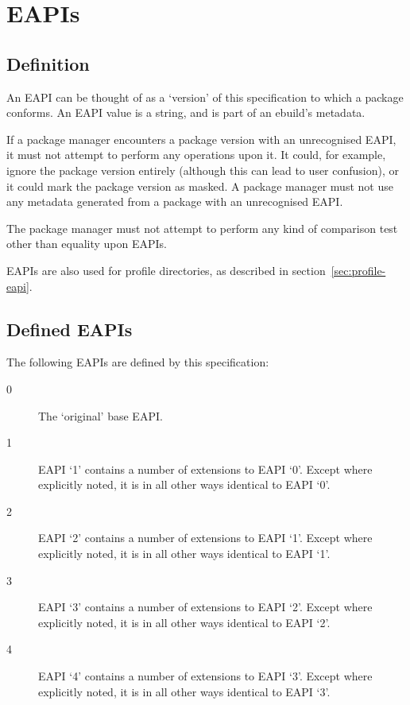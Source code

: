\chapter{EAPIs}

\section{Definition}

An EAPI can be thought of as a `version' of this specification to which a package conforms. An EAPI
value is a string, and is part of an ebuild's metadata.

If a package manager encounters a package version with an unrecognised EAPI, it must not attempt to
perform any operations upon it. It could, for example, ignore the package version entirely (although
this can lead to user confusion), or it could mark the package version as masked. A package manager
must not use any metadata generated from a package with an unrecognised EAPI.

The package manager must not attempt to perform any kind of comparison test other than equality upon
EAPIs.

EAPIs are also used for profile directories, as described in section~\ref{sec:profile-eapi}.

\section{Defined EAPIs}

The following EAPIs are defined by this specification:

\begin{description}
\item[0] The `original' base EAPI.
\item[1] EAPI `1' contains a number of extensions to EAPI `0'. Except where explicitly noted, it is
    in all other ways identical to EAPI `0'.
\item[2] EAPI `2' contains a number of extensions to EAPI `1'. Except where explicitly noted, it is
    in all other ways identical to EAPI `1'.
\item[3] EAPI `3' contains a number of extensions to EAPI `2'. Except where explicitly noted, it is
    in all other ways identical to EAPI `2'.
\item[4] EAPI `4' contains a number of extensions to EAPI `3'. Except where explicitly noted, it is
    in all other ways identical to EAPI `3'.
\end{description}

